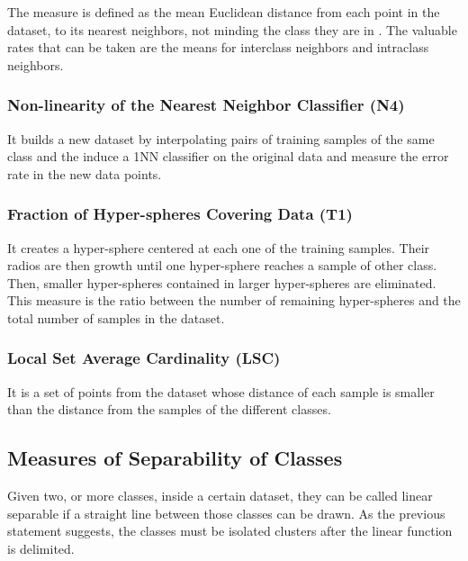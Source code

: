 The measure is defined as the mean Euclidean distance from each point in the 
dataset, to its nearest neighbors, not minding the class they are in
\cite{FriedmanRafsky}. The valuable rates that can be taken are the means 
for interclass neighbors and intraclass neighbors.

\subsubsection{Non-linearity of the Nearest Neighbor Classifier (N4)}

It builds a new dataset by interpolating pairs of training samples of the same  
class and the induce a 1NN classifier on the original data and measure the error
rate in the new data points.

\subsubsection{Fraction of Hyper-spheres Covering Data (T1)}

It creates a hyper-sphere centered at each one of the training samples. Their
radios are then growth until one hyper-sphere reaches a sample of other class.
Then, smaller hyper-spheres contained in larger hyper-spheres are eliminated.
This measure is the ratio between the number of remaining hyper-spheres and the
total number of samples in the dataset. 

\subsubsection{Local Set Average Cardinality (LSC)}

It is a set of points from the dataset whose distance of each sample is smaller
than the distance from the samples of the different classes. 

\subsection{Measures of Separability of Classes}\label{sec:linearity}

Given two, or more classes, inside a certain dataset, they can be called linear 
separable if a straight line between those classes can be drawn. As the 
previous statement suggests, the classes must be isolated clusters after the 
linear function is delimited.

